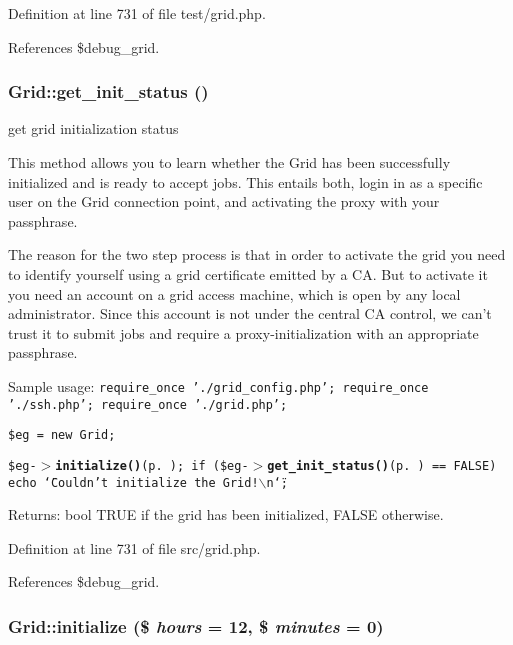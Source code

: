 Definition at line 731 of file test/grid.php.

References \$debug\_\-grid.
\subsubsection{\setlength{\rightskip}{0pt plus 5cm}Grid::get\_\-init\_\-status ()}\label{classGrid_a9}


get grid initialization status 

This method allows you to learn whether the Grid has been successfully initialized and is ready to accept jobs. This entails both, login in as a specific user on the Grid connection point, and activating the proxy with your passphrase.

The reason for the two step process is that in order to activate the grid you need to identify yourself using a grid certificate emitted by a CA. But to activate it you need an account on a grid access machine, which is open by any local administrator. Since this account is not under the central CA control, we can't trust it to submit jobs and require a proxy-initialization with an appropriate passphrase.

Sample usage: {\tt  require\_\-once './grid\_\-config.php'; require\_\-once './ssh.php'; require\_\-once './grid.php';}

{\tt  \$eg = new Grid;}

{\tt  \$eg-$>${\bf initialize()}{\rm (p.\,\pageref{classGrid_a11})}; if (\$eg-$>${\bf get\_\-init\_\-status()}{\rm (p.\,\pageref{classGrid_a9})} == FALSE) echo \char`\"{}Couldn't initialize the Grid!$\backslash$n\char`\"{}; }

\begin{Desc}
\item[Returns:]bool TRUE if the grid has been initialized, FALSE otherwise. \end{Desc}


Definition at line 731 of file src/grid.php.

References \$debug\_\-grid.
\subsubsection{\setlength{\rightskip}{0pt plus 5cm}Grid::initialize (\$ {\em hours} = 12, \$ {\em minutes} = 0)}\label{classGrid_a37}


